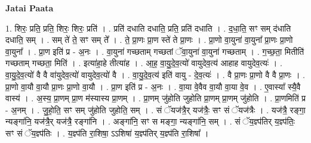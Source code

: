 \documentclass[17pt]{extarticle}
\begin{document}
\textbf{Jatai Paata} \newline

1. शिरः॒ प्रति॒ प्रति॒ शिरः॒ शिरः॒ प्रति॑ । . प्रति॑ दधाति दधाति॒ प्रति॒ प्रति॑ दधाति । . द॒धा॒ति॒ सꣳ सम् द॑धाति दधाति॒ सम् । . सम् ते॑ ते॒ सꣳ सम् ते᳚ । . ते॒ प्रा॒णः प्रा॒ण स्ते॑ ते प्रा॒णः । . प्रा॒णो वा॒युना॑ वा॒युना᳚ प्रा॒णः प्रा॒णो वा॒युना᳚ । . प्रा॒ण इति॑ प्र - अ॒नः । . वा॒युना॑ गच्छताम् गच्छतां ॅवा॒युना॑ वा॒युना॑ गच्छताम् । . ग॒च्छ॒ता॒ मितीति॑ गच्छताम् गच्छता॒ मिति॑ । . इत्या॑हा॒हे तीत्या॑ह । . आ॒ह॒ वा॒यु॒दे॒व॒त्यो॑ वायुदेव॒त्य॑ आहाह वायुदेव॒त्यः॑ । . वा॒यु॒दे॒व॒त्यो॑ वै वै वा॑युदेव॒त्यो॑ वायुदेव॒त्यो॑ वै । . वा॒यु॒दे॒व॒त्य॑ इति॑ वायु - दे॒व॒त्यः॑ । . वै प्रा॒णः प्रा॒णो वै वै प्रा॒णः । . प्रा॒णो वा॒यौ वा॒यौ प्रा॒णः प्रा॒णो वा॒यौ । . प्रा॒ण इति॑ प्र - अ॒नः । . वा॒या वे॒वैव वा॒यौ वा॒या वे॒व । . ए॒वास्या᳚ स्यै॒वै वास्य॑ । . अ॒स्य॒ प्रा॒णम् प्रा॒ण म॑स्यास्य प्रा॒णम् । . प्रा॒णम् जु॑होति जुहोति प्रा॒णम् प्रा॒णम् जु॑होति । . प्रा॒णमिति॑ प्र - अ॒नम् । . जु॒हो॒ति॒ सꣳ सम् जु॑होति जुहोति॒ सम् । . सं ॅयज॑त्रै॒र् यज॑त्रैः॒ सꣳ सं ॅयज॑त्रैः । . यज॑त्रै॒ रङ्गा॒ न्यङ्गा॑नि॒ यज॑त्रै॒र् यज॑त्रै॒ रङ्गा॑नि । . अङ्गा॑नि॒ सꣳ स मङ्गा॒ न्यङ्गा॑नि॒ सम् । . सं ॅय॒ज्ञ्प॑तिर् य॒ज्ञ्प॑तिः॒ सꣳ सं ॅय॒ज्ञ्प॑तिः । . य॒ज्ञ्प॑ति रा॒शिषा॒ ऽऽशिषा॑ य॒ज्ञ्प॑तिर् य॒ज्ञ्प॑ति रा॒शिषा᳚ । \newline
\end{document}
